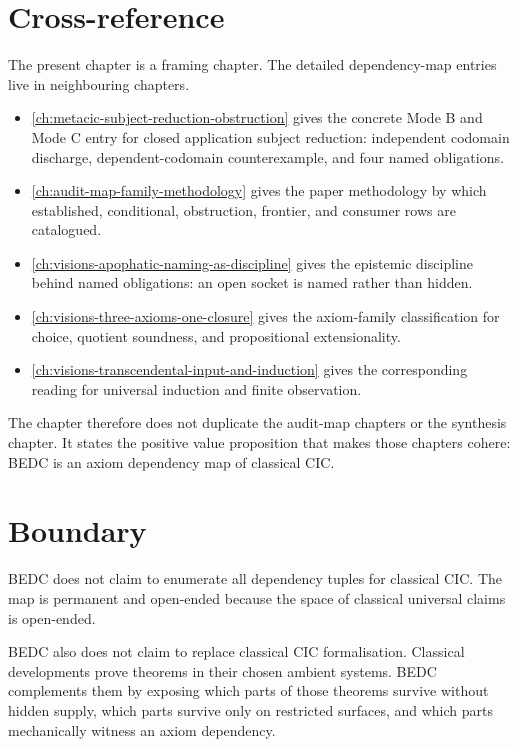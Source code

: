 \section{Cross-reference}
\label{sec:bedc-axiom-dependency-map-cross-reference}

The present chapter is a framing chapter. The detailed dependency-map entries live in neighbouring chapters.

\begin{itemize}
\item \autoref{ch:metacic-subject-reduction-obstruction} gives the concrete Mode B and Mode C entry for closed application subject reduction: independent codomain discharge, dependent-codomain counterexample, and four named obligations.
\item \autoref{ch:audit-map-family-methodology} gives the paper methodology by which established, conditional, obstruction, frontier, and consumer rows are catalogued.
\item \autoref{ch:visions-apophatic-naming-as-discipline} gives the epistemic discipline behind named obligations: an open socket is named rather than hidden.
\item \autoref{ch:visions-three-axioms-one-closure} gives the axiom-family classification for choice, quotient soundness, and propositional extensionality.
\item \autoref{ch:visions-transcendental-input-and-induction} gives the corresponding reading for universal induction and finite observation.
\end{itemize}

The chapter therefore does not duplicate the audit-map chapters or the synthesis chapter. It states the positive value proposition that makes those chapters cohere: BEDC is an axiom dependency map of classical CIC.

\section{Boundary}
\label{sec:bedc-axiom-dependency-map-boundary}

BEDC does not claim to enumerate all dependency tuples for classical CIC. The map is permanent and open-ended because the space of classical universal claims is open-ended.

BEDC also does not claim to replace classical CIC formalisation. Classical developments prove theorems in their chosen ambient systems. BEDC complements them by exposing which parts of those theorems survive without hidden supply, which parts survive only on restricted surfaces, and which parts mechanically witness an axiom dependency.

